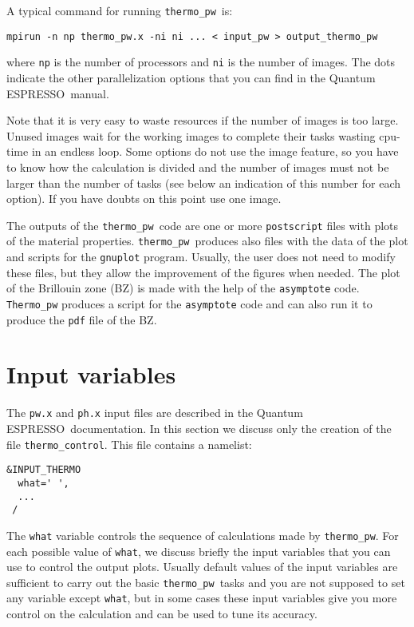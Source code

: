 \documentclass[12pt,a4paper]{article}
\def\qe{{\sc Quantum ESPRESSO}}
\def\thermo{\texttt{thermo\_pw}}
\begin{document}
A typical command for running \thermo\ is:
\begin{verbatim}
mpirun -n np thermo_pw.x -ni ni ... < input_pw > output_thermo_pw
\end{verbatim}
where \texttt{np} is the number of processors and \texttt{ni} is the number 
of images. The dots indicate the other parallelization options that
you can find in the \qe\ manual.

Note that it is very easy to waste resources if the number of 
images is too large. Unused images wait for the working images to complete
their tasks wasting cpu-time in an endless loop. 
Some options 
do not use the image feature, so you have to know how the calculation 
is divided and the number of images must not
be larger than the number of tasks (see below an indication of this number
for each option). If you have doubts on this point use one image.

The outputs of the \thermo\ code are one or more \texttt{postscript} files 
with plots of the material properties. \thermo\ produces also files with 
the data of 
the plot and scripts for the \texttt{gnuplot} program. 
Usually, the user does not need to modify these files, but they allow 
the improvement of the figures when needed.
The plot of the Brillouin zone (BZ) is made with the help of the 
\texttt{asymptote} code. \texttt{Thermo\_pw} produces a script 
for the \texttt{asymptote} code and can also run it to produce the \texttt{pdf}
file of the BZ. 

\newpage

\section{\color{coral}Input variables}

The \texttt{pw.x} and \texttt{ph.x} input files are described in the \qe\ documentation.
In this section we discuss only the creation of the file
\texttt{thermo\_control}. This file contains a namelist:  
\begin{verbatim}
&INPUT_THERMO
  what=' ',
  ...
 /
\end{verbatim}
The \texttt{what} variable controls the sequence of calculations made
by \thermo. For each possible value of \texttt{what}, we discuss briefly the
input variables that you can use to control the output plots. Usually
default values of the input variables are sufficient to carry out  
the basic \thermo\ tasks and you are not supposed to set any variable except
\texttt{what}, but in some cases these input variables give you more control
on the calculation and can be used to tune its accuracy.
\end{document}
